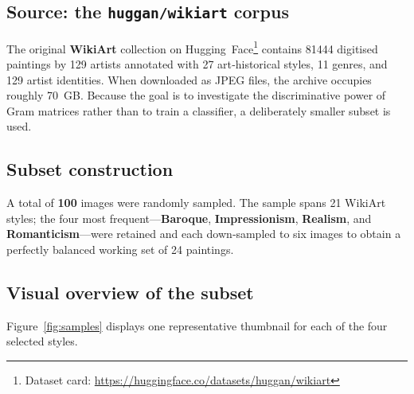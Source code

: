 \documentclass[a4paper,11pt]{article}
\begin{document}
\subsection{Source: the \texttt{huggan/wikiart} corpus}
The original \textbf{WikiArt} collection on Hugging~Face\footnote{Dataset card: \url{https://huggingface.co/datasets/huggan/wikiart}} contains \num{81444} digitised
paintings by \num{129} artists annotated with \num{27} art‑historical styles, \num{11} genres,
and \num{129} artist identities. When downloaded as JPEG files, the archive occupies roughly \SI{70}{GB}.
Because the goal is to investigate the discriminative power of Gram matrices rather than to train a classifier,
a deliberately smaller subset is used.

\subsection{Subset construction}
A total of \textbf{100} images were randomly sampled. The sample spans \num{21} WikiArt styles; the four most
frequent—\textbf{Baroque}, \textbf{Impressionism}, \textbf{Realism}, and \textbf{Romanticism}—were retained
and each down‑sampled to six images to obtain a perfectly balanced working set of \num{24} paintings.

\subsection{Visual overview of the subset}
Figure~\ref{fig:samples} displays one representative thumbnail for each of the four selected styles.
\end{document}
